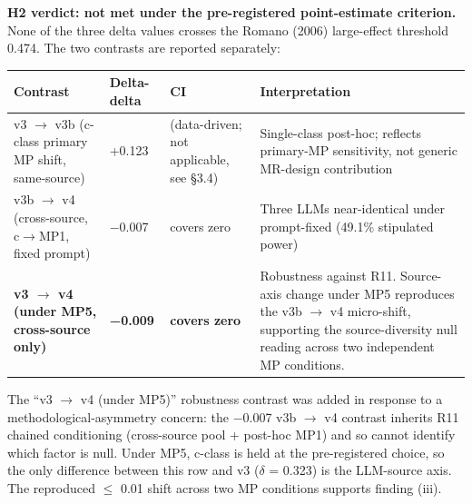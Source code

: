 \documentclass[review,12pt,authoryear]{elsarticle}
\newcounter{none}                   %
\begin{document}
\textbf{H2 verdict: not met under the pre-registered point-estimate
criterion.} None of the three delta values crosses the Romano (2006)
large-effect threshold 0.474. The two contrasts are reported separately:

{\def\LTcaptype{none} %
\begin{longtable}[]{@{}
  >{\raggedright\arraybackslash}p{}
  >{\raggedright\arraybackslash}p{}
  >{\raggedright\arraybackslash}p{}
  >{\raggedright\arraybackslash}p{}@{}}
\toprule\noalign{}
\begin{minipage}[b]{\linewidth}\raggedright
Contrast
\end{minipage} & \begin{minipage}[b]{\linewidth}\raggedright
Delta-delta
\end{minipage} & \begin{minipage}[b]{\linewidth}\raggedright
CI
\end{minipage} & \begin{minipage}[b]{\linewidth}\raggedright
Interpretation
\end{minipage} \\
\midrule\noalign{}
\endhead
\bottomrule\noalign{}
\endlastfoot
v3 $\to$ v3b (c-class primary MP shift, same-source) & +0.123 &
(data-driven; not applicable, see §3.4) & Single-class post-hoc;
reflects primary-MP sensitivity, not generic MR-design contribution \\
v3b $\to$ v4 (cross-source, c$\to$MP1, fixed prompt) & −0.007 & covers zero &
Three LLMs near-identical under prompt-fixed (49.1\% stipulated
power) \\
\textbf{v3 $\to$ v4 (under MP5, cross-source only)} & \textbf{−0.009} &
\textbf{covers zero} & Robustness against R11. Source-axis change under
MP5 reproduces the v3b $\to$ v4 micro-shift, supporting the source-diversity
null reading across two independent MP conditions. \\
\end{longtable}
}

The ``v3 $\to$ v4 (under MP5)'' robustness contrast was added in response to
a methodological-asymmetry concern: the −0.007 v3b $\to$ v4 contrast
inherits R11 chained conditioning (cross-source pool + post-hoc MP1) and
so cannot identify which factor is null. Under MP5, c-class is held at
the pre-registered choice, so the only difference between this row and
v3 ($\delta$ = 0.323) is the LLM-source axis. The reproduced $\leq$ 0.01 shift
across two MP conditions supports finding (iii).
\end{document}
